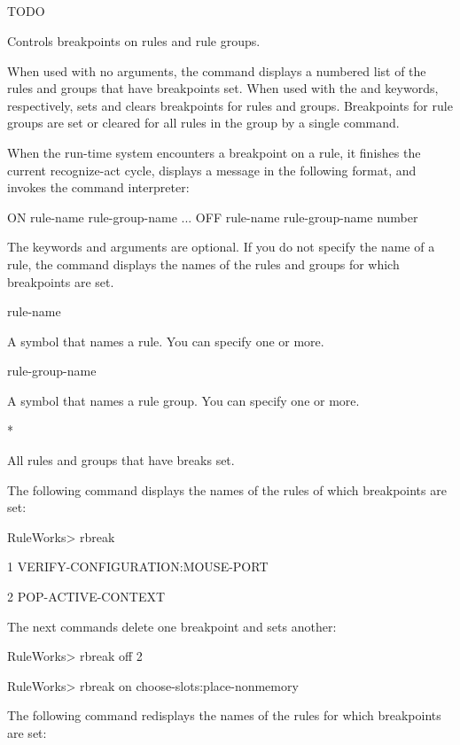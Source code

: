 {{\subsection{}
TODO

Controls breakpoints on rules and rule groups.

When used with no arguments, the command displays a numbered list of
the rules and groups that have breakpoints set. When used with the
 and  keywords, respectively,  sets and
clears breakpoints for rules and groups. Breakpoints for rule groups
are set or cleared for all rules in the group by a single command.

When the run-time system encounters a breakpoint on a rule, it
finishes the current recognize-act cycle, displays a message in the
following format, and invokes the command interpreter:


\Format

ON
{
rule-name
rule-group-name
}...
OFF
{
rule-name
rule-group-name
number
}

The keywords and arguments are optional. If you do not
specify the name of a rule, the command displays the names of
the rules and groups for which breakpoints are set.

\Arguments

rule-name

A symbol that names a rule. You can specify one or more.

rule-group-name

A symbol that names a rule group. You can specify one or
more.

*

All rules and groups that have breaks set.

\Example

The following command displays the names of the rules of
which breakpoints are set:

RuleWorks> rbreak

1 VERIFY-CONFIGURATION:MOUSE-PORT

2 POP-ACTIVE-CONTEXT

The next commands delete one breakpoint and sets another:

RuleWorks> rbreak off 2

RuleWorks> rbreak on choose-slots:place-nonmemory

The following command redisplays the names of the rules for
which breakpoints are set:

}}
